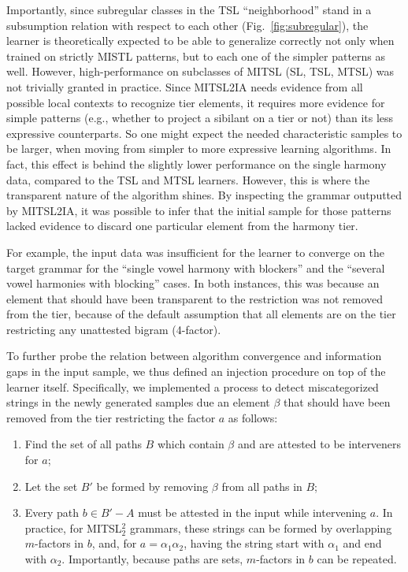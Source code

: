 \documentclass[11pt]{article}
\begin{document}
    Importantly, since subregular classes in the TSL ``neighborhood'' stand in a subsumption relation with respect to each other (Fig.\ \ref{fig:subregular}), the learner is theoretically expected to be able to generalize correctly not only when trained on strictly MISTL patterns, but to each one of the simpler patterns as well.
 However, high-performance on subclasses of MITSL (SL, TSL, MTSL) was not trivially granted in practice.\@
    Since MITSL2IA needs evidence from all possible local contexts to recognize tier elements, it requires more evidence for simple patterns (e.g., whether to project a sibilant on a tier or not) than its less expressive counterparts.\@
    So one might expect the needed characteristic samples to be larger, when moving from simpler to more expressive learning algorithms.
    In fact, this effect is behind the slightly lower performance on the single harmony data, compared to the TSL and MTSL learners.
    However, this is where the transparent nature of the algorithm shines.
    By inspecting the grammar outputted by MITSL2IA, it was possible to infer that the initial sample for those patterns lacked evidence to discard one particular element from the harmony tier.
    
    For example, the input data was insufficient for the learner to converge on the target grammar for the ``single vowel harmony with blockers'' and the ``several vowel harmonies with blocking'' cases.
    In both instances, this was because an element that should have been transparent to the restriction was not removed from the tier, because of the default assumption that all elements are on the tier restricting any unattested bigram (4-factor).
     
   To further probe the relation between algorithm convergence and information gaps in the input sample,  we thus defined an injection procedure on top of the learner itself.
   Specifically, we implemented a process to detect miscategorized strings in the newly generated samples due an element $\beta$ that should have been removed from the tier restricting the factor $a$ as follows:
   
   \begin{enumerate}
        \item Find the set of all paths $B$ which contain $\beta$ and are attested to be interveners for $a$;
        \item Let the set $B'$ be formed by removing $\beta$ from all paths in $B$;
        \item Every path $b \in B' - A$ must be attested in the input while intervening $a$. In practice, for MITSL$_2^2$ grammars, these strings can be formed by overlapping $m$-factors in $b$, and, for $a = \alpha_1 \alpha_2$, having the string start with $\alpha_1$ and end with $\alpha_2$. Importantly, because paths are sets, $m$-factors in $b$ can be repeated.
    \end{enumerate}
   
\end{document}
